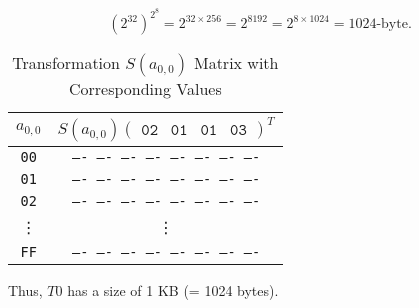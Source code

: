 \[
(2^{32})^{2^8} = 2^{32 \times 256} = 2^{8192} = 2^{8 \times 1024} = 1024\text{-byte}.
\]

\begin{table}[h!]
	\centering
	\begin{tabular}{c|c}
		\hline
		$a_{0,0}$ & $S(a_{0,0})\begin{pmatrix} \texttt{02} & \texttt{01} & \texttt{01} & \texttt{03} \end{pmatrix}^T$ \\
		\hline
		\texttt{00} & \texttt{---- ---- ---- ---- ---- ---- ---- ----} \\
		\hline
		\texttt{01} & \texttt{---- ---- ---- ---- ---- ---- ---- ----} \\
		\hline
		\texttt{02} & \texttt{---- ---- ---- ---- ---- ---- ---- ----} \\
		\hline
		\vdots & \vdots \\
		\hline
		\texttt{FF} & \texttt{---- ---- ---- ---- ---- ---- ---- ----} \\
		\hline
	\end{tabular}
\caption{Transformation $S(a_{0,0})$ Matrix with Corresponding Values}
\end{table}

Thus, $T0$ has a size of 1 KB (= 1024 bytes).

